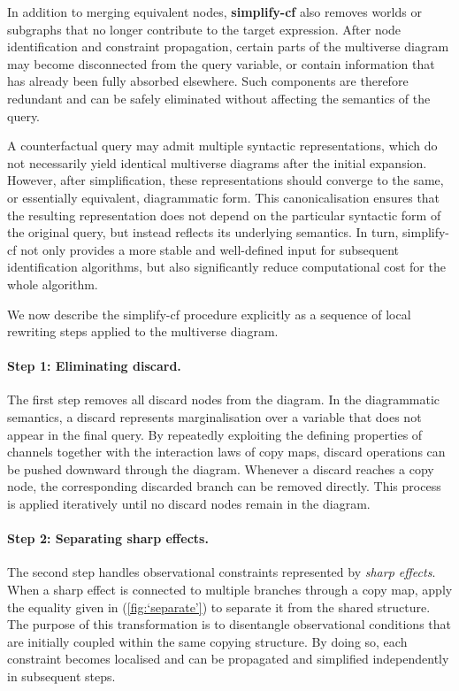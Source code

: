\documentclass[a4paper]{report}
\begin{document}
In addition to merging equivalent nodes, \textbf{simplify-cf} also removes worlds or subgraphs that no longer contribute to the target expression. After node identification and constraint propagation, certain parts of the multiverse diagram may become disconnected from the query variable, or contain information that has already been fully absorbed elsewhere. Such components are therefore redundant and can be safely eliminated without affecting the semantics of the query.

A counterfactual query may admit multiple syntactic representations, which do not necessarily yield identical multiverse diagrams after the initial expansion. However, after simplification, these representations should converge to the same, or essentially equivalent, diagrammatic form. This canonicalisation ensures that the resulting representation does not depend on the particular syntactic form of the original query, but instead reflects its underlying semantics. In turn, simplify-cf not only provides a more stable and well-defined input for subsequent identification algorithms, but also significantly reduce computational cost for the whole algorithm.

We now describe the simplify-cf procedure explicitly as a sequence of local rewriting steps applied to the multiverse diagram.

\paragraph{Step 1: Eliminating discard.}
The first step removes all discard nodes from the diagram. 
In the diagrammatic semantics, a discard represents marginalisation over a variable that does not appear in the final query. By repeatedly exploiting the defining properties of channels together with the interaction laws of copy maps, discard operations can be pushed downward through the diagram. Whenever a discard reaches a copy node, the corresponding discarded branch can be removed directly. This process is applied iteratively until no discard nodes remain in the diagram. 

\paragraph{Step 2: Separating sharp effects.}
The second step handles observational constraints represented by \emph{sharp effects}. When a sharp effect is connected to multiple branches through a copy map, apply the equality given in (\ref{fig:‘separate’}) to separate it from the shared structure. The purpose of this transformation is to disentangle observational conditions that are initially coupled within the same copying structure. By doing so, each constraint becomes localised and can be propagated 
and simplified independently in subsequent steps. 
\end{document}
